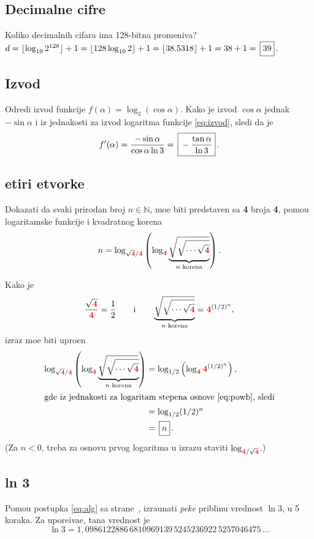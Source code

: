 \documentclass[12pt, twoside, a4paper]{article}
\def\logten{\log_{10}}
\def\.{{,}}
\begin{document}
\subsection{Decimalne cifre}
\zad Koliko decimalnih cifara ima 128-bitna promen{\lj}iva?
\ans $d=\lfloor\logten 2^{128}\rfloor+1=\lfloor 128\logten 2\rfloor+1=\lfloor 38.5318\rfloor+1=38+1=\ram{39}.$


\subsection{Izvod}
\zad Odredi izvod funkcije $f(\alpha)=\log_3(\cos\alpha)$.
\ans Kako je izvod $\cos\alpha$ jednak $-\sin\alpha$ i iz jednakosti 
za izvod logaritma funkcije \eqref{eq:izvod}, sledi da je
$$
f'(\alpha)
={-\sin\alpha\over\cos\alpha\ln3}
=\ram{-{\tan\alpha\over\ln3}}.
$$

\clearpage

\subsection{{\Cv}etiri {\cv}etvorke}

\def\4{{\color{red}\bf4}}

\zad
Dokazati da svaki prirodan broj $n\in{\mathbb N}$, mo{\zv}e biti predstav{\lj}en sa \4 broja \4,
pomo{\cc}u logaritamske funkcije i kvadratnog korena
$$
n=\log_{\sqrt\4/\4}\left(\log_\4 \underbrace{\sqrt{\sqrt{\cdots\sqrt\4}}}_{\text{$n$ korena}}\right).
$$

\ans
Kako je
$$
{\sqrt \4\over \4}={1\over2}
\qquad\text{i}\qquad
\underbrace{\sqrt{\sqrt{\cdots\sqrt \4}}}_{\text{$n$ korena}}=\4^{(1/2)^n},
$$
izraz mo{\zv}e biti upro{\sv}{\cc}en
\begin{align*}
\log_{\sqrt\4/\4}\left(\log_\4 \underbrace{\sqrt{\sqrt{\cdots\sqrt\4}}}_{\text{$n$ korena}} \right)
&=\log_{1/2}\left(\log_\4 \4^{(1/2)^n}\right),\\
\intertext{gde iz jednakosti za logaritam stepena osnove \eqref{eq:powb}, sledi}
&=\log_{1/2}(1/2)^n\\
&=\ram{n}.
\end{align*}
(Za $n<0$, treba za osnovu prvog logaritma u izrazu
staviti $\log_{\4/\sqrt\4}$.)

\subsection{ln 3}\label{sssec:ln3}
 
\zad
Pomo{\cc}u postupka \eqref{eq:alg} sa 
strane~\pageref{eq:alg},
izra{\cv}unati {\sl pe{\sv}ke\/} pribli{\zv}nu vrednost $\ln 3$, 
u 5 koraka. Za upore{\dj}iva{\nj}e, ta{\cv}na vrednost je
$$
\ln3=1\.
0986122886\,
6810969139\,
5245236922\,
5257046475\,\ldots
$$
\end{document}
